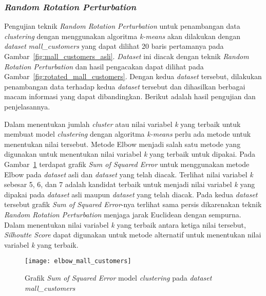 \subsubsection{\textit{Random Rotation Perturbation}}
\label{subsubsec:pengujian-clustering-rrp}

Pengujian teknik \textit{Random Rotation Perturbation} untuk penambangan data \textit{clustering} dengan menggunakan algoritma \textit{k-means} akan dilakukan dengan \textit{dataset} \textit{mall\_customers} yang dapat dilihat 20 baris pertamanya pada Gambar~\ref{fig:mall_customers_asli}. \textit{Dataset} ini diacak dengan teknik \textit{Random Rotation Perturbation} dan hasil pengacakan dapat dilihat pada Gambar~\ref{fig:rotated_mall_customers}. Dengan kedua \textit{dataset} tersebut, dilakukan penambangan data terhadap kedua \textit{dataset} tersebut dan dihasilkan berbagai macam informasi yang dapat dibandingkan. Berikut adalah hasil pengujian dan penjelasannya.

Dalam menentukan jumlah \textit{cluster} atau nilai variabel \textit{k} yang terbaik untuk membuat model \textit{clustering} dengan algoritma \textit{k-means} perlu ada metode untuk menentukan nilai tersebut. Metode Elbow menjadi salah satu metode yang digunakan untuk  menentukan nilai variabel \textit{k} yang terbaik untuk dipakai. Pada Gambar~\ref{fig:elbow_mall_customers} terdapat grafik \textit{Sum of Squared Error} untuk menggunakan metode Elbow pada \textit{dataset} asli dan \textit{dataset} yang telah diacak. Terlihat nilai variabel \textit{k} sebesar 5, 6, dan 7 adalah kandidat terbaik untuk menjadi nilai variabel \textit{k} yang dipakai pada \textit{dataset} asli maupun \textit{dataset} yang telah diacak. Pada kedua \textit{dataset} tersebut grafik \textit{Sum of Squared Error}-nya terlihat sama persis dikarenakan teknik \textit{Random Rotation Perturbation} menjaga jarak Euclidean dengan sempurna. Dalam menentukan nilai variabel \textit{k} yang terbaik antara ketiga nilai tersebut, \textit{Silhoutte Score} dapat digunakan untuk metode alternatif untuk menentukan nilai variabel \textit{k} yang terbaik.

\begin{figure}
	\centering
	\texttt{[image: elbow\_mall\_customers]}
	\caption{Grafik \textit{Sum of Squared Error} model \textit{clustering} pada \textit{dataset} \textit{mall\_customers}}
	\label{fig:elbow_mall_customers}
\end{figure}

